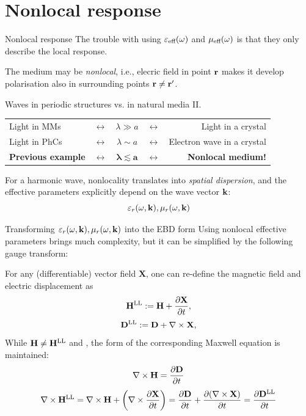 \documentclass[t]{beamer} \usepackage[english]{babel} \usepackage[utf8]{inputenc} \usetheme{Frankfurt} %
\begin{document}
\section{Nonlocal response}
\begin{frame}{Nonlocal response}%
	The trouble with using $\varepsilon_{\text{eff} }(\omega)$ and $\mu_{\text{eff} }(\omega)$ is that they only describe the local response. \vspace{.5em}

The medium may be \textit{nonlocal}, i.e., elecric field in point ${\mathbf{r}}$ makes it develop polarisation also in surrounding points ${\mathbf{r}}\neq{\mathbf{r}}'$.
	
\begin{exampleblock}{Waves in periodic structures vs. in natural media II.}
\centering \begin{tabular}{lcccr}
Light in MMs    &$\leftrightarrow$  &$\lambda \gg a$ &$\leftrightarrow$ 	& Light in a crystal         	\\
Light in PhCs   &$\leftrightarrow$  &$\lambda \sim a$ &$\leftrightarrow$ 	& Electron wave in a crystal 	\\
	\textbf{Previous example}  &$\leftrightarrow$  &$\mathbf{\pmb{\lambda\lesssim a}}$ &$\leftrightarrow$ 	& \textbf{Nonlocal medium!}\\
\end{tabular}
\end{exampleblock}

For a harmonic wave, nonlocality translates into \textit{spatial dispersion}, and the effective parameters explicitly depend on the wave vector ${\mathbf{k}}$: 
$$\varepsilon_r(\omega,{\mathbf{k}}), \mu_r(\omega,{\mathbf{k}})$$
\end{frame} %

\begin{frame}{Transforming $\varepsilon_r(\omega,{\mathbf{k}}), \mu_r(\omega,{\mathbf{k}})$ into the EBD form}%
Using nonlocal effective parameters brings much complexity, but it can be simplified by the following gauge transform:\vspace{.5em}

For any (differentiable) vector field $\mathbf{X}$, one can re-define the magnetic field and electric displacement as
\begin{equation*} {\mathbf{H}^\text{LL}} := \mathbf{H} + \frac{\partial\mathbf{X}}{\partial t}, \label{eq_HHsd}\end{equation*}
\begin{equation*} {\mathbf{D}^\text{LL}}  := \mathbf{D}  + \nabla\times \mathbf{X}, \label{eq_Dsd}\end{equation*}
While $\mathbf{H} \neq {\mathbf{H}^\text{LL}}$ and , 
the form of the corresponding Maxwell equation is maintained:
\begin{equation*} \nabla \times \mathbf{H} =  \frac{\partial \mathbf{D}} {\partial t} \end{equation*}
\begin{equation*} \nabla \times {\mathbf{H}^\text{LL}} = \nabla \times \mathbf{H} + \left(\nabla\times \frac{\partial\mathbf{X}}{\partial t}\right) = \frac{\partial \mathbf{D}}{\partial t}+ \frac{\partial(\nabla\times \mathbf{X})}{\partial t} =  \frac{\partial {\mathbf{D}^\text{LL}}} {\partial t} \end{equation*}


\end{frame} %
\end{document}
